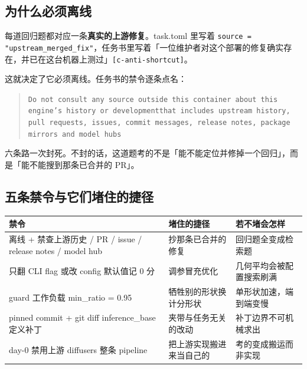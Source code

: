 \subsection{为什么必须离线}

每道回归题都对应一条\textbf{真实的上游修复}。task.toml 里写着 \texttt{source = "upstream\_merged\_fix"}，任务书里写着「一位维护者对这个部署的修复确实存在，并已在这台机器上测过」{\scriptsize\texttt{[c-\hspace{0pt}anti-\hspace{0pt}shortcut]}}。


这就决定了它必须离线。任务书的禁令逐条点名：


\begin{quote}\small
\texttt{Do not consult any source outside this container about this engine's history or development}\texttt{that includes upstream history, pull requests, issues, commit messages, release notes, package mirrors and model hubs}

\end{quote}

六条路一次封死。不封的话，这道题考的不是「能不能定位并修掉一个回归」，而是「能不能搜到那条已合并的 PR」。


\subsection{五条禁令与它们堵住的捷径}


\begin{table}[t]
\centering
\footnotesize
\setlength{\tabcolsep}{4pt}
\label{tab:2}
\begin{tabularx}{\textwidth}{Xll}
\toprule
禁令 & 堵住的捷径 & 若不堵会怎样 \\
\midrule
离线 + 禁查上游历史 / PR / issue / release notes / model hub & 抄那条已合并的修复 & 回归题全变成检索题 \\
只翻 CLI flag 或改 config 默认值记 0 分 & 调参冒充优化 & 几何平均会被配置搜索刷满 \\
guard 工作负载 min\_ratio = 0.95 & 牺牲别的形状换计分形状 & 单形状加速，端到端变慢 \\
pinned commit + git diff inference\_base 定义补丁 & 夹带与任务无关的改动 & 补丁边界不可机械求出 \\
day-0 禁用上游 diffusers 整条 pipeline & 把上游实现搬进来当自己的 & 考的变成搬运而非实现 \\
\bottomrule
\end{tabularx}
\end{table}

